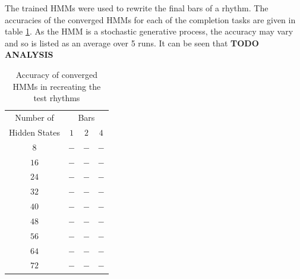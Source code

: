 \documentclass[ author={Stephen Livermore-Tozer},
				supervisor={Dr. Peter Flach},
				degree={MEng},
				title={Algorithmic Co-composition Using Machine Learning},
				subtitle={},
				type={research},
				year={2016} ]{dissertation}
\begin{document}
	
	The trained HMMs were used to rewrite the final bars of a rhythm. The accuracies of the converged HMMs for each of the completion tasks are given in table \ref{tab:hmm-results}. As the HMM is a stochastic generative process, the accuracy may vary and so is listed as an average over 5 runs. It can be seen that \textbf{TODO ANALYSIS}
	
	\begin{table}[h]
		\begin{center}
			\begin{tabular}{cccc}
				\toprule
				Number of& \multicolumn{3}{c}{Bars}\\
				\cline{2-4}
				Hidden States& $1$ & $2$ & $4$\\
				\hline
				$8$ & $-$ & $-$ & $-$\\
				$16$ & $-$ & $-$ & $-$\\
				$24$ & $-$ & $-$ & $-$\\
				$32$ & $-$ & $-$ & $-$\\
				$40$ & $-$ & $-$ & $-$\\
				$48$ & $-$ & $-$ & $-$\\
				$56$ & $-$ & $-$ & $-$\\
				$64$ & $-$ & $-$ & $-$\\
				$72$ & $-$ & $-$ & $-$\\
				\bottomrule
			\end{tabular}
		\end{center}
		\caption{Accuracy of converged HMMs in recreating the test rhythms}
		\label{tab:hmm-results}
	\end{table}
	
\end{document}
